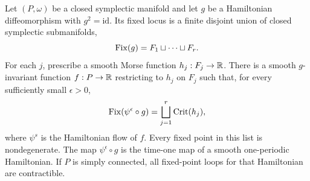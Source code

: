 \begin{proposition}\label{inv:perturb}
Let $(P,\omega)$ be a closed symplectic manifold and let $g$ be a
Hamiltonian diffeomorphism with $g^2=\mathrm{id}$. Its fixed locus is a
finite disjoint union of closed symplectic submanifolds,
\[
  \operatorname{Fix}(g)=F_1\sqcup\cdots\sqcup F_r.
\]
For each $j$, prescribe a smooth Morse function $h_j:F_j\to\mathbb R$.
There is a smooth $g$-invariant function $f:P\to\mathbb R$ restricting to $h_j$
on $F_j$ such that, for every sufficiently small $\epsilon>0$,
\[
  \operatorname{Fix}(\psi^\epsilon\circ g)
  =\bigsqcup_{j=1}^r\operatorname{Crit}(h_j),
\]
where $\psi^s$ is the Hamiltonian flow of $f$. Every fixed point in this
list is nondegenerate. The map $\psi^\epsilon\circ g$ is the time-one map
of a smooth one-periodic Hamiltonian. If $P$ is simply connected, all
fixed-point loops for that Hamiltonian are contractible.
\end{proposition}

